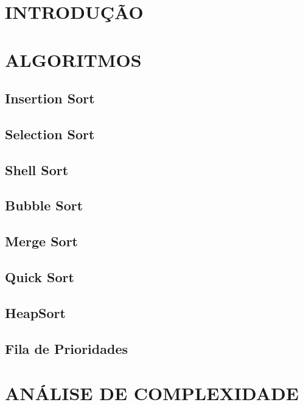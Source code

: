 \documentclass[12pt,arial]{article}
\begin{document}
		\tableofcontents
		\newpage
  
		\section{INTRODUÇÃO}
		
		\newpage

            \section{ALGORITMOS}
		\subsection{Insertion Sort}
		
        \subsection{Selection Sort}
		
        \subsection{Shell Sort}
		
        \newpage
        \subsection{Bubble Sort}
		
		\newpage
        \subsection{Merge Sort}
		
        \subsection{Quick Sort}
		
        \subsection{HeapSort}
		
        \subsection{Fila de Prioridades}
		
         
            \section{ANÁLISE DE COMPLEXIDADE}
\end{document}
